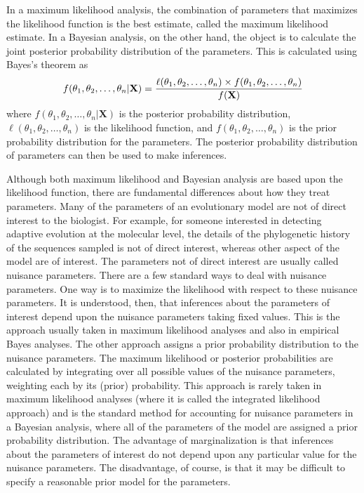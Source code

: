 \documentclass{svmult}
\begin{document}
In a maximum likelihood analysis, the combination of parameters that maximizes the likelihood 
function is the best estimate, called the maximum likelihood estimate. In a Bayesian analysis,
on the other hand, the object is to calculate the joint posterior probability distribution
of the parameters. This is calculated using Bayes's theorem as
$$
f(\theta_1, \theta_2, \ldots, \theta_n | \mathbf{X}) = {\ell(\theta_1, \theta_2, \ldots, \theta_n) 
\times f(\theta_1, \theta_2, \ldots, \theta_n) \over f(\mathbf{X}) }
$$
where $f(\theta_1, \theta_2, \ldots, \theta_n | \mathbf{X})$ is the posterior probability
distribution, $\ell(\theta_1, \theta_2, \ldots, \theta_n)$ is the likelihood function, and
$f(\theta_1, \theta_2, \ldots, \theta_n)$ is the prior probability distribution for the parameters.
The posterior probability distribution of parameters can then be used to make inferences.

Although both maximum likelihood and Bayesian analysis are based upon the likelihood
function, there are fundamental differences about how they treat parameters.
Many of the parameters of an evolutionary model are not of direct interest to the biologist.
For example, for someone interested in detecting adaptive evolution at the molecular level, the
details of the phylogenetic history of the sequences sampled is not of direct interest, whereas
other aspect of the model are of interest. The parameters not of direct interest are usually
called nuisance parameters. There are a few standard ways to deal with nuisance parameters. One way
is to maximize the likelihood with respect to these nuisance parameters. It is understood, then,
that inferences about the parameters of interest depend upon the nuisance parameters taking
fixed values. This is the approach usually taken in maximum likelihood analyses and also in
empirical Bayes analyses. The other approach assigns a prior probability distribution to the
nuisance parameters. The maximum likelihood or posterior probabilities are calculated by integrating
over all possible values of the nuisance parameters, weighting each by its (prior) probability. This approach
is rarely taken in maximum likelihood analyses (where it is called the integrated likelihood
approach) and is the standard method for accounting for nuisance parameters in a Bayesian analysis, where all
of the parameters of the model are assigned a prior probability distribution.
The advantage of marginalization is that inferences about the parameters of interest do not
depend upon any particular value for the nuisance parameters. The disadvantage, of course, is that
it may be difficult to specify a reasonable prior model for the parameters.
\end{document}
